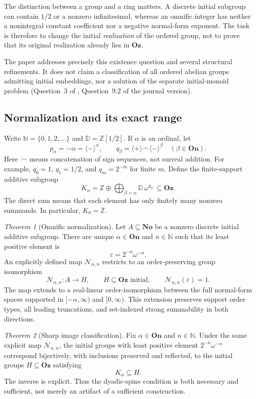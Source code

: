 \documentclass[11pt]{article}
\theoremstyle{definition}
\theoremstyle{remark}
\newtheorem{maintheorem}{Theorem}
\newcommand{\No}{\ensuremath{\mathbf{No}}}
\newcommand{\Oz}{\ensuremath{\mathbf{Oz}}}
\newcommand{\On}{\ensuremath{\mathbf{On}}}
\newcommand{\Z}{\mathbb{Z}}
\newcommand{\N}{\mathbb{N}}
\newcommand{\D}{\mathbb{D}}
\newcommand{\cat}{\mathbin{\frown}}
\newcommand{\plus}{\langle+\rangle}
\newcommand{\minus}{\langle-\rangle}
\newcommand{\Rect}{\mathcal{N}_{\alpha,n}}
\begin{document}
The distinction between a group and a ring matters. A discrete initial
subgroup can contain $1/2$ or a nonzero infinitesimal, whereas an omnific
integer has neither a nonintegral constant coefficient nor a negative
normal-form exponent. The task is therefore to change the initial
\emph{realization} of the ordered group, not to prove that its original
realization already lies in $\Oz$.

The paper addresses precisely this existence question and several
structural refinements. It does not claim a classification of all ordered
abelian groups admitting initial embeddings, nor a solution of the
separate initial-monoid problem (Question~3 of \cite{EK}, Question~9.2
of the journal version).

\subsection{Normalization and its exact range}
Write $\N=\{0,1,2,\ldots\}$ and $\D=\Z[1/2]$. If $\alpha$ is an ordinal, let
\[
 p_\alpha=-\alpha=\minus^{\alpha},
 \qquad q_\beta=\plus\cat\minus^{\beta}\quad(\beta\in\On).
\]
Here $\cat$ means concatenation of sign sequences, not surreal addition.
For example, $q_0=1$, $q_1=1/2$, and $q_m=2^{-m}$ for finite $m$.
Define the finite-support additive subgroup
\begin{equation}\label{isg:eq:Kintro}
 K_\alpha=\Z\oplus\bigoplus_{\beta<\alpha}\D\,\omega^{q_\beta}
 \ \subseteq\Oz.
\end{equation}
The direct sum means that each element has only finitely many nonzero
summands. In particular, $K_0=\Z$.

\begin{maintheorem}[Omnific normalization]\label{isg:thm:A}
Let $A\subseteq\No$ be a nonzero discrete initial additive subgroup.
There are unique $\alpha\in\On$ and $n\in\N$ such that its least positive
element is
\[
 \varepsilon=2^{-n}\omega^{-\alpha}.
\]
An explicitly defined map $\Rect$ restricts to an order-preserving group
isomorphism
\[
 \Rect:A\longrightarrow H,
 \qquad H\subseteq\Oz\text{ initial},\qquad \Rect(\varepsilon)=1.
\]
The map extends to a real-linear order-isomorphism between the full
normal-form spaces supported in $[-\alpha,\infty)$ and $[0,\infty)$.
This extension preserves support order types, all leading truncations,
and set-indexed strong summability in both directions.
\end{maintheorem}

\begin{maintheorem}[Sharp image classification]\label{isg:thm:B}
Fix $\alpha\in\On$ and $n\in\N$. Under the same explicit map $\Rect$,
the initial groups with least positive element
$2^{-n}\omega^{-\alpha}$ correspond bijectively, with inclusions
preserved and reflected, to the initial groups $H\subseteq\Oz$ satisfying
\[
 K_\alpha\subseteq H.
\]
The inverse is explicit. Thus the dyadic-spine condition is both necessary
and sufficient, not merely an artifact of a sufficient construction.
\end{maintheorem}
\end{document}
